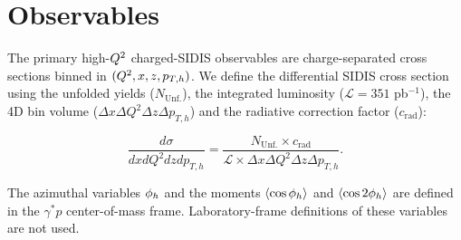 \section{Observables}
\label{sec:observables}

The primary high-$Q^{2}$ charged-SIDIS observables are charge-separated cross sections binned in $(Q^{2},x,z,p_{T,h})$. We define the differential SIDIS cross section using the unfolded yields ($N_{\mathrm{Unf.}}$), the integrated luminosity ($\mathcal{L}=351$ pb$^{-1}$), the 4D bin volume ($\Delta x\Delta Q^2\Delta z \Delta p_{T,h}$) and the radiative correction factor ($c_{\mathrm{rad}}$):

\begin{equation}
    \frac{d\sigma}{dxdQ^2dzdp_{T,h}} = \frac{N_{\mathrm{Unf.}}\times c_{\mathrm{rad}}}{\mathcal{L}\times\Delta x\Delta Q^2\Delta z \Delta p_{T,h}}.
\end{equation}


The azimuthal variables $\phi_{h}$ and the moments
$\langle\cos\phi_{h}\rangle$ and $\langle\cos2\phi_{h}\rangle$ are defined in the
$\gamma^{*}p$ center-of-mass frame.  Laboratory-frame definitions of these
variables are not used.
